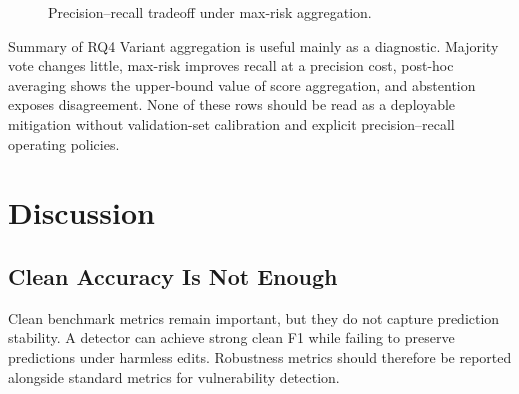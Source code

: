 \documentclass[a4paper,fleqn]{cas-dc}
\begin{document}
\begin{table}
  \centering
  \caption{Post-hoc LineVul threshold sensitivity.}
  \label{tab:linevul-threshold}
\end{table}

\begin{figure}
  \centering
  \resizebox{\columnwidth}{!}{}
  \caption{Precision--recall tradeoff under max-risk aggregation.}
  \label{fig:aggregation-tradeoff}
\end{figure}

\begin{rqsummarybox}{Summary of RQ4}
Variant aggregation is useful mainly as a diagnostic. Majority vote changes
little, max-risk improves recall at a precision cost, post-hoc averaging shows
the upper-bound value of score aggregation, and abstention exposes
disagreement. None of these rows should be read as a deployable mitigation
without validation-set calibration and explicit precision--recall operating
policies.
\end{rqsummarybox}

\section{Discussion}

\subsection{Clean Accuracy Is Not Enough}

Clean benchmark metrics remain important, but they do not capture prediction
stability. A detector can achieve strong clean F1 while failing to preserve
predictions under harmless edits. Robustness metrics should therefore be
reported alongside standard metrics for vulnerability detection.
\end{document}
